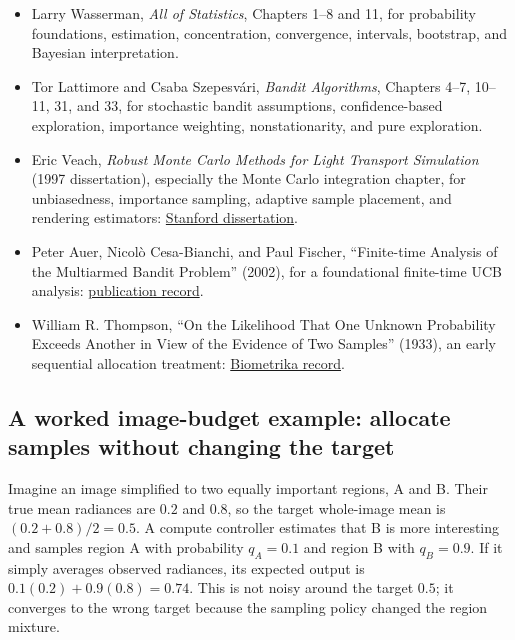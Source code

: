 \begin{itemize}
\tightlist
\item
  Larry Wasserman, \emph{All of Statistics}, Chapters 1--8 and 11, for probability foundations, estimation, concentration, convergence, intervals, bootstrap, and Bayesian interpretation.
\item
  Tor Lattimore and Csaba Szepesvári, \emph{Bandit Algorithms}, Chapters 4--7, 10--11, 31, and 33, for stochastic bandit assumptions, confidence-based exploration, importance weighting, nonstationarity, and pure exploration.
\item
  Eric Veach, \emph{Robust Monte Carlo Methods for Light Transport Simulation} (1997 dissertation), especially the Monte Carlo integration chapter, for unbiasedness, importance sampling, adaptive sample placement, and rendering estimators: \href{https://graphics.stanford.edu/papers/veach_thesis/}{Stanford dissertation}.
\item
  Peter Auer, Nicolò Cesa-Bianchi, and Paul Fischer, ``Finite-time Analysis of the Multiarmed Bandit Problem'' (2002), for a foundational finite-time UCB analysis: \href{https://www2.compute.dtu.dk/pubdb/pubs/2088-full.html}{publication record}.
\item
  William R. Thompson, ``On the Likelihood That One Unknown Probability Exceeds Another in View of the Evidence of Two Samples'' (1933), an early sequential allocation treatment: \href{https://academic.oup.com/biomet/article-abstract/25/3-4/285/200862}{Biometrika record}.
\end{itemize}

\subsection{A worked image-budget example: allocate samples without changing the target}\label{03-visual-computing-i-ch012-a-worked-image-budget-example-allocate-samples-without-changing-the-target}

\hypertarget{03-visual-computing-i-ch012-a-worked-image-budget-example-allocate-samples-without-changing-the-target}{}

Imagine an image simplified to two equally important regions, A and B. Their true mean radiances are \(0.2\) and \(0.8\), so the target whole-image mean is \((0.2+0.8)/2=0.5\). A compute controller estimates that B is more interesting and samples region A with probability \(q_A=0.1\) and region B with \(q_B=0.9\). If it simply averages observed radiances, its expected output is \(0.1(0.2)+0.9(0.8)=0.74\). This is not noisy around the target \(0.5\); it converges to the wrong target because the sampling policy changed the region mixture.

